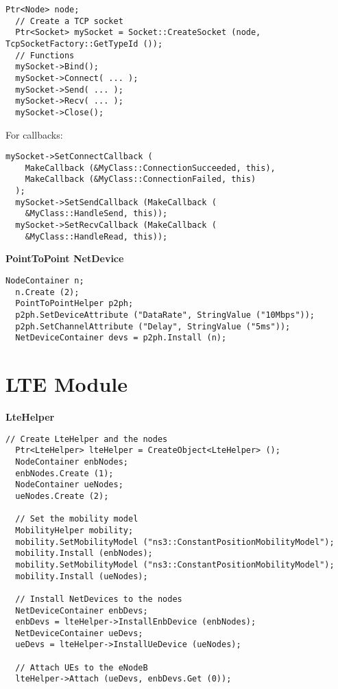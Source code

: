 \begin{lstlisting}[language=myC++, caption={ns-3 Socket programming}, captionpos=b]
  Ptr<Node> node;
  // Create a TCP socket
  Ptr<Socket> mySocket = Socket::CreateSocket (node, TcpSocketFactory::GetTypeId ());
  // Functions
  mySocket->Bind();
  mySocket->Connect( ... );
  mySocket->Send( ... );
  mySocket->Recv( ... );
  mySocket->Close();
\end{lstlisting}

For callbacks:

\begin{lstlisting}[language=myC++, caption={Socket callbacks}, captionpos=b]
  mySocket->SetConnectCallback (
    MakeCallback (&MyClass::ConnectionSucceeded, this),
    MakeCallback (&MyClass::ConnectionFailed, this)
  );
  mySocket->SetSendCallback (MakeCallback (
    &MyClass::HandleSend, this));
  mySocket->SetRecvCallback (MakeCallback (
    &MyClass::HandleRead, this));
\end{lstlisting}

\textbf{PointToPoint NetDevice}

\begin{lstlisting}[language=myC++, caption={PointToPointHelper}, captionpos=b]
  NodeContainer n;
  n.Create (2);
  PointToPointHelper p2ph;
  p2ph.SetDeviceAttribute ("DataRate", StringValue ("10Mbps"));
  p2ph.SetChannelAttribute ("Delay", StringValue ("5ms"));
  NetDeviceContainer devs = p2ph.Install (n);
\end{lstlisting}

\section{LTE Module}
\textbf{LteHelper}
\label{sec:ltehelpercode}

\begin{lstlisting}[language=myC++,caption={LteHelper usage}, captionpos=b]
  // Create LteHelper and the nodes
  Ptr<LteHelper> lteHelper = CreateObject<LteHelper> ();
  NodeContainer enbNodes;
  enbNodes.Create (1);
  NodeContainer ueNodes;
  ueNodes.Create (2);

  // Set the mobility model
  MobilityHelper mobility;
  mobility.SetMobilityModel ("ns3::ConstantPositionMobilityModel");
  mobility.Install (enbNodes);
  mobility.SetMobilityModel ("ns3::ConstantPositionMobilityModel");
  mobility.Install (ueNodes);

  // Install NetDevices to the nodes
  NetDeviceContainer enbDevs;
  enbDevs = lteHelper->InstallEnbDevice (enbNodes);
  NetDeviceContainer ueDevs;
  ueDevs = lteHelper->InstallUeDevice (ueNodes);  

  // Attach UEs to the eNodeB
  lteHelper->Attach (ueDevs, enbDevs.Get (0));
\end{lstlisting}

